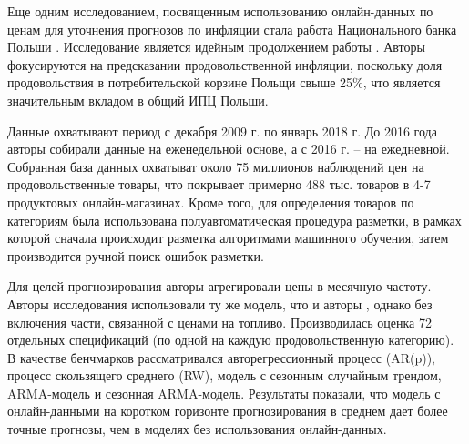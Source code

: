 Еще одним исследованием, посвященным использованию онлайн-данных по ценам для уточнения прогнозов по инфляции стала работа Национального банка Польши \cite{macias2023nowcasting}. Исследование является идейным продолжением работы \cite{aparicio2020forecasting}. Авторы фокусируются на предсказании продовольственной инфляции, поскольку доля продовольствия в потребительской корзине Польщи свыше 25\%, что является значительным вкладом в общий ИПЦ Польши.

Данные охватывают период с декабря 2009 г. по январь 2018 г. До 2016 года авторы собирали данные на еженедельной основе, а с 2016 г. – на ежедневной. Собранная база данных охватыват около 75 миллионов наблюдений цен на продовольственные товары, что покрывает примерно 488 тыс. товаров в 4-7 продуктовых онлайн-магазинах. Кроме того, для определения товаров по категориям была использована полуавтоматическая процедура разметки, в рамках которой сначала происходит разметка алгоритмами машинного обучения, затем производится ручной поиск ошибок разметки.

Для целей прогнозирования авторы агрегировали цены в месячную частоту. Авторы исследования использовали ту же модель, что и авторы \cite{aparicio2020forecasting}, однако без включения части, связанной с ценами на топливо. Производилась оценка 72 отдельных спецификаций (по одной на каждую продовольственную категорию). В качестве бенчмарков рассматривался авторегрессионный процесс (AR(p)), процесс скользящего среднего (RW), модель с сезонным случайным трендом, ARMA-модель и сезонная ARMA-модель. Результаты показали, что модель с онлайн-данными на коротком горизонте прогнозирования в среднем дает более точные прогнозы, чем в моделях без использования онлайн-данных.